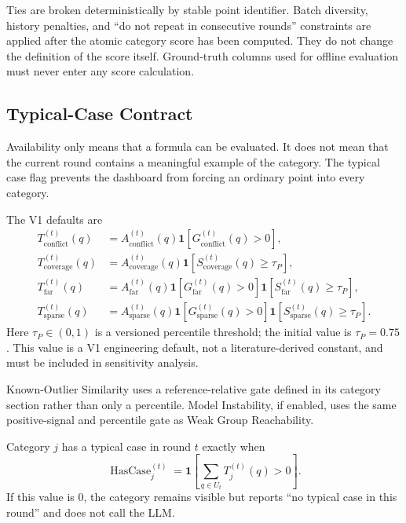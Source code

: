 \documentclass[11pt]{article}
\begin{document}
Ties are broken deterministically by stable point identifier. Batch diversity,
history penalties, and ``do not repeat in consecutive rounds'' constraints are
applied after the atomic category score has been computed. They do not change
the definition of the score itself. Ground-truth columns used for offline
evaluation must never enter any score calculation.

\subsection{Typical-Case Contract}

Availability only means that a formula can be evaluated. It does not mean that
the current round contains a meaningful example of the category. The typical
case flag prevents the dashboard from forcing an ordinary point into every
category.

The V1 defaults are
\begin{align}
T_{\mathrm{conflict}}^{(t)}(q)
&=
A_{\mathrm{conflict}}^{(t)}(q)
\mathbf{1}[G_{\mathrm{conflict}}^{(t)}(q)>0],\\
T_{\mathrm{coverage}}^{(t)}(q)
&=
A_{\mathrm{coverage}}^{(t)}(q)
\mathbf{1}[S_{\mathrm{coverage}}^{(t)}(q)\geq\tau_P],\\
T_{\mathrm{far}}^{(t)}(q)
&=
A_{\mathrm{far}}^{(t)}(q)
\mathbf{1}[G_{\mathrm{far}}^{(t)}(q)>0]
\mathbf{1}[S_{\mathrm{far}}^{(t)}(q)\geq\tau_P],\\
T_{\mathrm{sparse}}^{(t)}(q)
&=
A_{\mathrm{sparse}}^{(t)}(q)
\mathbf{1}[G_{\mathrm{sparse}}^{(t)}(q)>0]
\mathbf{1}[S_{\mathrm{sparse}}^{(t)}(q)\geq\tau_P].
\end{align}
Here $\tau_P\in(0,1)$ is a versioned percentile threshold; the initial value is
$\tau_P=0.75$. This value is a V1 engineering default, not a literature-derived
constant, and must be included in sensitivity analysis.

Known-Outlier Similarity uses a reference-relative gate defined in its category
section rather than only a percentile. Model Instability, if enabled, uses the
same positive-signal and percentile gate as Weak Group Reachability.

Category $j$ has a typical case in round $t$ exactly when
\begin{equation}
    \operatorname{HasCase}_j^{(t)}
    =
    \mathbf{1}\!\left[
        \sum_{q\in U_t}T_j^{(t)}(q)>0
    \right].
\end{equation}
If this value is $0$, the category remains visible but reports ``no typical case
in this round'' and does not call the LLM.
\end{document}
